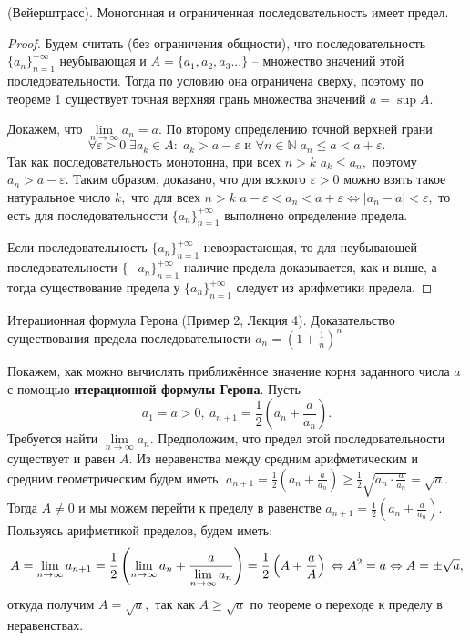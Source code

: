 \begin{theorem} \textrm{(Вейерштрасс)}.
    Монотонная и ограниченная последовательность
    имеет предел.
\end{theorem}
\begin{proof}
    Будем считать (без ограничения общности),
    что последовательность
    $\{a_n\}_{n=1}^{+\infty}$ неубывающая
    и $A=\{a_1, a_2, a_3...\}$ -- множество
    значений этой последовательности.
    Тогда по условию она ограничена сверху,
    поэтому по теореме 1 существует точная
    верхняя грань множества значений $a=\sup A$.

    Докажем, что
    $\lim\limits_{n\rightarrow\infty}a_n=a.$
    По второму определению точной верхней
    грани
    $$
        \forall\varepsilon>0\;\exists
        a_k\in A:\;a_k>a-\varepsilon
        \textrm{ и }
        \forall
        n\in\mathbb{N}\;a_n\leq a<a+\varepsilon.
    $$
    Так как последовательность монотонна,
    при всех $n>k$ $a_k\leq a_n,$
    поэтому $a_n>a-\varepsilon.$
    Таким образом, доказано, что
    для всякого $\varepsilon>0$
    можно взять такое натуральное число $k,$
    что для всех $n>k$ $a-\varepsilon<a_n<
        a+\varepsilon\Leftrightarrow
        |a_n-a|<\varepsilon,$ то есть
    для последовательности
    $\{a_n\}_{n=1}^{+\infty}$ выполнено
    определение предела.

    Если последовательность $\{a_n\}_{n=1}^{+\infty}$
    невозрастающая, то для неубывающей последовательности
    $\{-a_n\}_{n=1}^{+\infty}$ наличие предела
    доказывается, как и выше, а тогда существование
    предела у $\{a_n\}_{n=1}^{+\infty}$ следует
    из арифметики предела.
\end{proof}

\newpage
\begin{problem}
Итерационная формула Герона (Пример 2, Лекция 4). Доказательство существования предела последовательности $a_n = \left(1+\frac{1}{n}\right)^n$
\end{problem}

Покажем, как можно вычислять
приближённое значение корня
заданного числа $a$ с помощью
\textbf{итерационной формулы Герона}.
Пусть $$a_1=a>0, \ a_{n+1}=
    \frac{1}{2}\left(a_n
    +\frac{a}{a_n}\right).$$
Требуется найти
$\lim\limits_{n\rightarrow\infty}a_n.$
Предположим, что предел
этой последовательности
существует и равен $A.$
Из неравенства между средним
арифметическим и средним геометрическим
будем иметь: $a_{n+1}=
    \frac{1}{2}\left(a_n
    +\frac{a}{a_n}\right)\geq
    \frac{1}{2}\sqrt{a_n
        \cdot\frac{a}{a_n}}=\sqrt{a}.$
Тогда $A\neq0$ и мы можем перейти к пределу
в равенстве $a_{n+1}=
    \frac{1}{2}\left(a_n
    +\frac{a}{a_n}\right).$
Пользуясь арифметикой пределов,
будем иметь:
$$
    A=\lim\limits_{n\rightarrow\infty}a_{n+1}=
    \frac{1}{2}\left(\lim\limits_{n\rightarrow\infty}a_n
    +\frac{a}{\lim\limits_{n\rightarrow\infty}a_n}\right)=
    \frac{1}{2}\left(A
    +\frac{a}{A}\right)\\
    \Leftrightarrow A^2=a \Leftrightarrow A=\pm\sqrt{a},
$$
откуда получим $A=\sqrt{a},$ так как $A\geq
    \sqrt{a}$ по теореме о переходе к
пределу в неравенствах.

